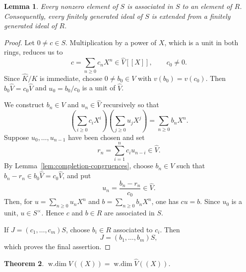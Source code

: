 \documentclass[12pt]{amsart}
\newtheorem{theorem}{Theorem}[section]
\newtheorem{lemma}[theorem]{Lemma}
\theoremstyle{plain}
\newcommand{\wdim}{\operatorname{w.dim}}
\begin{document}
\begin{lemma}\label{lem:finitely-generated-ideal-descent}
Every nonzero element of $S$ is associated in $S$ to
an element of $R$.  Consequently, every finitely generated ideal of
$S$ is extended from a finitely generated ideal of $R$.
\end{lemma}

\begin{proof}
Let $0\neq c\in S$.  Multiplication by a power of $X$, which is
a unit in both rings, reduces us to
\[
  c=\sum_{n\geq0}c_nX^n\in\widehat V[[X]],\qquad c_0\neq0.
\]
Since $\widehat K/K$ is immediate, choose $0\neq b_0\in V$ with
$v(b_0)=v(c_0)$.  Then $b_0\widehat V=c_0\widehat V$ and
$u_0=b_0/c_0$ is a unit of $\widehat V$.

We construct $b_n\in V$ and $u_n\in\widehat V$ recursively so that
\[
  \left(\sum_{i\geq0}c_iX^i\right)
  \left(\sum_{j\geq0}u_jX^j\right)
  =\sum_{n\geq0}b_nX^n.
\]
Suppose $u_0,\ldots,u_{n-1}$ have been chosen and set
\[
  r_n=\sum_{i=1}^n c_i u_{n-i}\in\widehat V.
\]
By Lemma~\ref{lem:completion-congruences}, choose $b_n\in V$ such that
$b_n-r_n\in b_0\widehat V=c_0\widehat V$, and put
\[
  u_n=\frac{b_n-r_n}{c_0}\in\widehat V.
\]
Then, for
$u=\sum_{n\geq0}u_nX^n$ and $b=\sum_{n\geq0}b_nX^n$, one has
$cu=b$.  Since $u_0$ is a unit, $u\in S^\times$.  Hence $c$
and $b\in R$ are associated in $S$.

If $J=(c_1,\ldots,c_m)S$, choose $b_i\in R$ associated to
$c_i$.  Then
\[
  J=(b_1,\ldots,b_m)S,
\]
which proves the final assertion.
\end{proof}

\begin{theorem}\label{thm:completion-invariance}
$\wdim V((X))=\wdim\widehat V((X))$.
\end{theorem}
\end{document}

